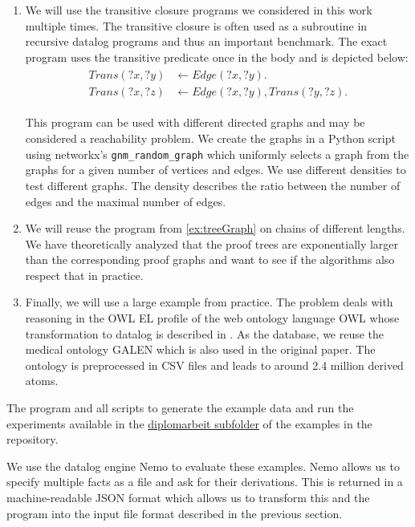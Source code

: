 \begin{enumerate}
    \item We will use the transitive closure programs we considered in this work multiple times. The transitive closure is often used as a subroutine in recursive datalog programs and thus an important benchmark. The exact program uses the transitive predicate once in the body and is depicted below:
    \begin{align*}
        \begin{split}
            Trans(?x, ?y) &\leftarrow Edge(?x, ?y). \\
            Trans(?x, ?z) &\leftarrow Edge(?x, ?y),  Trans(?y, ?z). 
        \end{split}
    \end{align*}

    This program can be used with different directed graphs and may be considered a reachability problem. We create the graphs in a Python script using networkx's \lstinline|gnm_random_graph| which uniformly selects a graph from the graphs for a given number of vertices and edges. We use different densities to test different graphs. The density describes the ratio between the number of edges and the maximal number of edges.

    \item We will reuse the program from \cref{ex:treeGraph} on chains of different lengths. We have theoretically analyzed that the proof trees are exponentially larger than the corresponding proof graphs and want to see if the algorithms also respect that in practice.
    
    \item Finally, we will use a large example from practice. The problem deals with reasoning in the OWL EL profile of the web ontology language OWL whose transformation to datalog is described in \cite{ELK}. As the database, we reuse the medical ontology GALEN which is also used in the original paper. The ontology is preprocessed in CSV files and leads to around 2.4 million derived atoms.
\end{enumerate}

The program and all scripts to generate the example data and run the experiments available in the \href{https://github.com/knowsys/CertifyingDatalog/tree/diplomarbeit/Examples/diplomarbeit}{diplomarbeit subfolder} of the examples in the repository.

We use the datalog engine Nemo\cite{Nemo} to evaluate these examples. Nemo allows us to specify multiple facts as a file and ask for their derivations. This is returned in a machine-readable JSON format which allows us to transform this and the program into the input file format described in the previous section.

